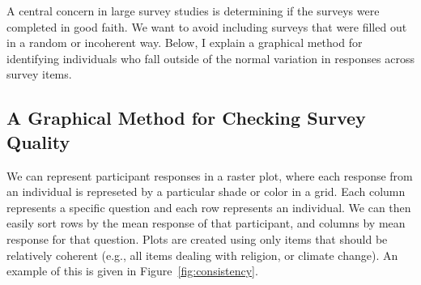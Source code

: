 A central concern in large survey studies is determining if the surveys were
completed in good faith. We want to avoid including surveys that were filled out
in a random or incoherent way. Below, I explain a graphical method for identifying individuals who fall outside
of the normal variation in responses across survey items.

\subsection{A Graphical Method for Checking Survey Quality}

We can represent participant responses in a raster plot, where each response
from an individual is represeted by a particular shade or color in a grid. Each
column represents a specific question and each row represents an individual. We
can then easily sort rows by the mean response of that participant, and columns
by mean response for that question. Plots are created using only items that
should be relatively coherent (e.g., all items dealing with religion, or climate
change). An example of this is given in Figure~\ref{fig:consistency}.

